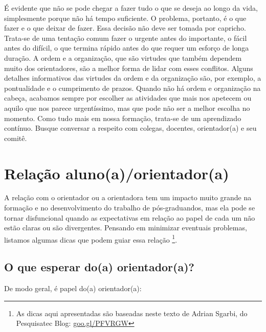 É evidente que não se pode chegar a fazer tudo o que se deseja ao
longo da vida, simplesmente porque não há tempo suficiente. O
problema, portanto, é o que fazer e o que deixar de fazer. Essa
decisão não deve ser tomada por capricho. Trata-se de uma tentação
comum fazer o urgente antes do importante, o fácil antes do difícil, o
que termina rápido antes do que requer um esforço de longa duração. A
ordem e a organização, que são virtudes que também dependem muito dos
orientadores, são a melhor forma de lidar com esses conflitos. Alguns
detalhes informativos das virtudes da ordem e da organização são, por
exemplo, a pontualidade e o cumprimento de prazos. Quando não há ordem
e organização na cabeça, acabamos sempre por escolher as atividades
que mais nos apetecem ou aquilo que nos parece urgentíssimo, mas que
pode não ser a melhor escolha no momento. Como tudo mais em nossa
formação, trata-se de um aprendizado contínuo. Busque conversar a
respeito com colegas, docentes, orientador(a) e seu comitê.

\section{Relação aluno(a)/orientador(a)}

A relação com o orientador ou a orientadora tem um impacto muito
grande na formação e no desenvolvimento do trabalho de pós-graduandos,
mas ela pode se tornar disfuncional quando as expectativas em relação
ao papel de cada um não estão claras ou são divergentes. Pensando em
minimizar eventuais problemas, listamos algumas dicas que podem guiar
essa relação \footnote{As dicas aqui apresentadas são baseadas neste
  texto de Adrian Sgarbi, do Pesquisatec Blog: {\url{goo.gl/PFVRGW}}}.

\subsection{O que esperar do(a) orientador(a)?}

	De modo geral, é papel do(a) orientador(a):
	
